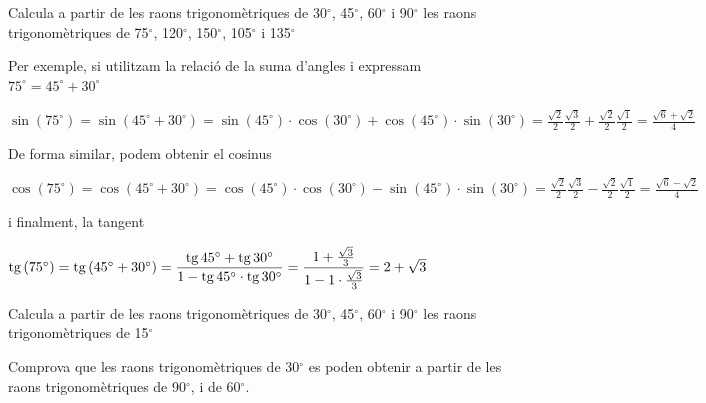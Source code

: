 \begin{mylist}
	\exer
	Calcula a partir de les raons trigonomètriques de
	30${}^\circ$, 45${}^\circ$, 60${}^\circ$ i
	90${}^\circ$ les raons trigonomètriques de
	75${}^\circ$, 120${}^\circ$, 150${}^\circ$, 
	105${}^\circ$ i 135${}^\circ$
	
	\begin{example}[*]
		Per exemple, si utilitzam la relació de la suma d'angles i expressam $75^\circ =45^\circ + 30^\circ$
		
		$\sin(75^\circ)=\sin(45^\circ + 30^\circ)=\sin(45^\circ)\cdot \cos(30^\circ) + \cos(45^\circ)\cdot \sin(30^\circ)=\frac{\sqrt{2}}{2}\frac{\sqrt{3}}{2}+\frac{\sqrt{2}}{2}\frac{\sqrt{1}}{2}=\frac{\sqrt{6}+\sqrt{2}}{4}$
	\end{example}
	
	\begin{example}[*]	
		De forma similar, podem obtenir el cosinus
		
		$\cos(75^\circ)=\cos(45^\circ + 30^\circ)=\cos(45^\circ)\cdot \cos(30^\circ) - \sin(45^\circ)\cdot \sin(30^\circ)=\frac{\sqrt{2}}{2}\frac{\sqrt{3}}{2}-\frac{\sqrt{2}}{2}\frac{\sqrt{1}}{2}=\frac{\sqrt{6}-\sqrt{2}}{4}$
		
		i finalment, la tangent
		
		$\mathrm{tg}\,(75^\circ)=\mathrm{tg}\,(45^\circ + 30^\circ)=\dfrac{\mathrm{tg}\, 45^\circ + \mathrm{tg}\, 30^\circ}{1-\mathrm{tg}\, 45^\circ \cdot \mathrm{tg}\, 30^\circ}=\dfrac{1 + \frac{\sqrt{3}}{3}}{1-1 \cdot \frac{\sqrt{3}}{3}}=2+\sqrt{3}$
	\end{example}
	
	\exer
	Calcula a partir de les raons trigonomètriques de
	30${}^\circ$, 45${}^\circ$, 60${}^\circ$ i
	90${}^\circ$ les raons trigonomètriques de
	15${}^\circ$
	
	
	\exer
	Comprova que les raons trigonomètriques de 30${}^\circ$ es
	poden obtenir a partir de les raons trigonomètriques de 90${}^\circ$, 
	i de 60${}^\circ$.
	
	

\end{mylist}
